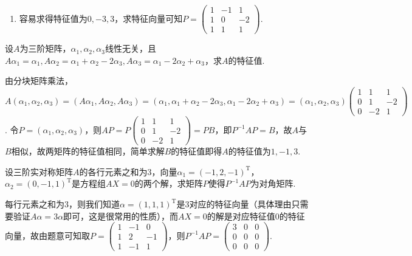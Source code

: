 \begin{exercise}
\begin{exgroup}
\begin{answer}
\begin{enumerate}
              \item 容易求得特征值为$0,-3,3$，求特征向量可知$P=\begin{pmatrix}
                            1 & -1 & 1 \\ 1 & 0 & -2 \\ 1 & 1 & 1
                        \end{pmatrix}$.
          \end{enumerate}
        \end{answer}
        \item 设$A$为三阶矩阵，$\alpha_1,\alpha_2,\alpha_3$线性无关，且$A\alpha_1=\alpha_1,A\alpha_2=\alpha_1+\alpha_2-2\alpha_3,A\alpha_3=\alpha_1-2\alpha_2+\alpha_3$，求$A$的特征值.
        \begin{answer}
            由分块矩阵乘法，$A(\alpha_1,\alpha_2,\alpha_3)=(A\alpha_1,A\alpha_2,A\alpha_3)=(\alpha_1,\alpha_1+\alpha_2-2\alpha_3,\alpha_1-2\alpha_2+\alpha_3)=(\alpha_1,\alpha_2,\alpha_3)\begin{pmatrix}
                1 & 1 & 1 \\ 0 & 1 & -2 \\ 0 & -2 & 1
            \end{pmatrix}$. 令$P=(\alpha_1,\alpha_2,\alpha_3)$，则$AP=P\begin{pmatrix}
                1 & 1 & 1 \\ 0 & 1 & -2 \\ 0 & -2 & 1
            \end{pmatrix}=PB$，即$P^{-1}AP=B$，故$A$与$B$相似，故两矩阵的特征值相同，简单求解$B$的特征值即得$A$的特征值为$1,-1,3$.
        \end{answer}
        \item 设三阶实对称矩阵$A$的各行元素之和为3，向量$\alpha_1=(-1,2,-1)^\mathrm{T}$，$\alpha_2=(0,-1,1)^\mathrm{T}$是方程组$AX=0$的两个解，求矩阵$P$使得$P^{-1}AP$为对角矩阵.
        \begin{answer}
            每行元素之和为3，则我们知道$\alpha=(1,1,1)^\mathrm{T}$是3对应的特征向量（具体理由只需要验证$A\alpha=3\alpha$即可，这是很常用的性质），而$AX=0$的解是对应特征值0的特征向量，故由题意可知取$P=\begin{pmatrix}
                1 & -1 & 0 \\ 1 & 2 & -1 \\ 1 & -1 & 1
            \end{pmatrix}$，则$P^{-1}AP=\begin{pmatrix}
                3 & 0 & 0 \\ 0 & 0 & 0 \\ 0 & 0 & 0
            \end{pmatrix}$.
        \end{answer}
    \end{exgroup}


\end{exercise}
